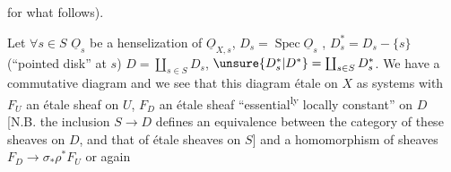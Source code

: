 

for what follows). 

Let $\forall s\in S$ $\underline{O}_s$ be a henselization of $\underline{O}_{X,s}$,
$D_s=\operatorname{Spec}\underline{O}_s$ , $D_s^{*}=D_s-\{s\}$  (``pointed disk'' at
$s$) $D=\coprod_{s\in S}D_s$, $\unsure{D_s^{*}|D^{*}}=\coprod_{s\in S}D_s^{*}$. We have
a commutative diagram
and we see  that this diagram  
  étale on $X$ 
as systems  
with $F_U$ an étale sheaf on $U$, $F_D$ an étale
sheaf ``essential\textsuperscript{ly} locally constant'' on $D$ [N.B. the
inclusion $S\to D$ defines an equivalence
between the category of these sheaves on $D$, and
that of étale sheaves on $S$] and
a homomorphism of sheaves $F_D\to\sigma_{*}\rho^{*}F_U$ or again

